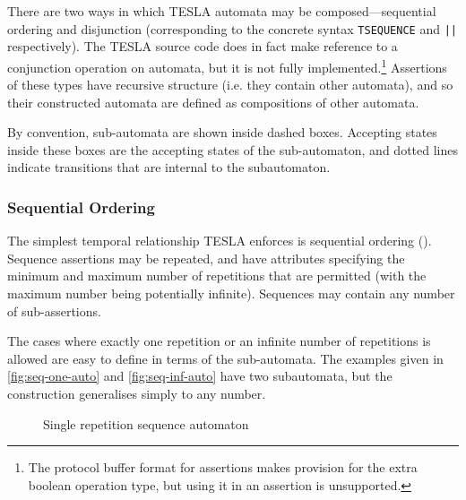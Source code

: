 There are two ways in which TESLA automata may be composed---sequential ordering
and disjunction (corresponding to the concrete syntax \texttt{TSEQUENCE}
and \texttt{||} respectively). The TESLA source code does in fact make
reference to a conjunction operation on automata, but it is not fully
implemented.\footnote{The protocol buffer format for assertions makes provision
for the extra boolean operation type, but using it in an assertion is
unsupported.} Assertions of these types have recursive structure (i.e. they
contain other automata), and so their constructed automata are defined as
compositions of other automata.

By convention, sub-automata are shown inside dashed boxes. Accepting states
inside these boxes are the accepting states of the sub-automaton, and dotted
lines indicate transitions that are internal to the subautomaton.

\subsubsection{Sequential Ordering}

The simplest temporal relationship TESLA enforces is sequential ordering
(). Sequence assertions
may be repeated, and have attributes specifying the minimum and maximum number
of repetitions that are permitted (with the maximum number being potentially
infinite). Sequences may contain any number of sub-assertions.

The cases where exactly one repetition or an infinite number of repetitions is
allowed are easy to define in terms of the sub-automata. The examples given in
\autoref{fig:seq-one-auto} and \autoref{fig:seq-inf-auto} have two subautomata,
but the construction generalises simply to any number.

\begin{figure}[ht]
  \centering
  \caption{Single repetition sequence automaton}
  \label{fig:seq-one-auto}
\end{figure}

